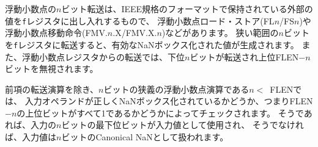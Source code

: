 \begin{comment}
Floating-point $n$-bit transfer operations move external values held
in IEEE standard formats into and out of the {\tt f} registers, and
comprise floating-point loads and stores (FL$n$/FS$n$) and
floating-point move instructions (FMV.$n$.X/FMV.X.$n$).  A narrower
$n$-bit transfer, \mbox{$n<$ FLEN}, into the {\tt f} registers will create a
valid NaN-boxed value.  A narrower $n$-bit transfer out of
the floating-point registers will transfer the lower $n$ bits of the
register ignoring the upper FLEN$-n$ bits.
\end{comment}

浮動小数点の$n$ビット転送は、IEEE規格のフォーマットで保持されている外部の値を{\tt f}レジスタに出し入れするもので、
浮動小数点ロード・ストア(FL$n$/FS$n$)や浮動小数点移動命令(FMV.$n$.X/FMV.X.$n$)などがあります。 
狭い範囲の$n$ビットを{\tt f}レジスタに転送すると、有効なNaNボックス化された値が生成されます。 
また、浮動小数点レジスタからの転送では、下位$n$ビットが転送され上位FLEN$-n$ビットを無視されます。

\begin{comment}
Apart from transfer operations described in the previous paragraph,
all other floating-point operations on narrower $n$-bit operations,
\mbox{$n<$ FLEN}, check if the input operands are correctly NaN-boxed,
i.e., all upper FLEN$-n$ bits are 1.  If so, the $n$ least-significant
bits of the input are used as the input value, otherwise the input
value is treated as an $n$-bit canonical NaN.
\end{comment}

前項の転送演算を除き、$n$ビットの狭義の浮動小数点演算である\mbox{$n<$ FLEN}では、
入力オペランドが正しくNaNボックス化されているかどうか、つまりFLEN$-n$の上位ビットがすべて1であるかどうかによってチェックされます。
そうであれば、入力の$n$ビットの最下位ビットが入力値として使用され、
そうでなければ、入力値は$n$ビットのCanonical NaNとして扱われます。

